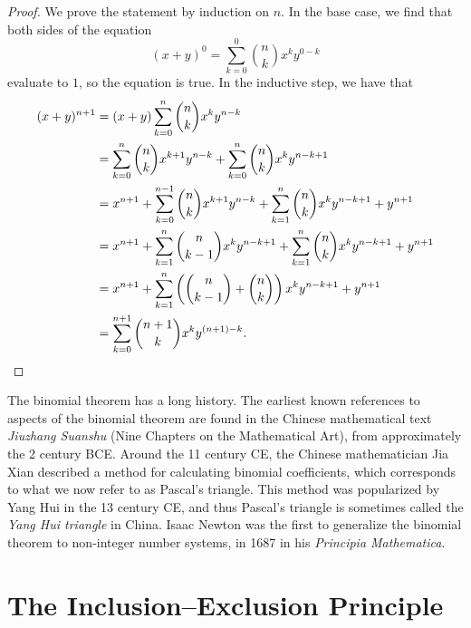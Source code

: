 \begin{proof}
  We prove the statement by induction on $n$. In the base case, we find that both sides of the equation
  \begin{equation*}
    (x+y)^0=\sum_{k=0}^0 \binom{n}{k}x^ky^{0-k}
  \end{equation*}
  evaluate to $1$, so the equation is true. In the inductive step, we have that
  \begin{align*}
    (x+y)^{n+1} & =(x+y)\sum_{k=0}^n \binom{n}{k}x^ky^{n-k} \\
                & = \sum_{k=0}^n \binom{n}{k}x^{k+1}y^{n-k} + \sum_{k=0}^n\binom{n}{k}x^ky^{n-k+1} \\
                & = x^{n+1} + \sum_{k=0}^{n-1} \binom{n}{k}x^{k+1}y^{n-k} + \sum_{k=1}^n\binom{n}{k}x^ky^{n-k+1} + y^{n+1} \\
                & = x^{n+1} + \sum_{k=1}^{n} \binom{n}{k-1}x^{k}y^{n-k+1} + \sum_{k=1}^n\binom{n}{k}x^ky^{n-k+1} + y^{n+1} \\
                & = x^{n+1} + \sum_{k=1}^n \left(\binom{n}{k-1}+\binom{n}{k}\right)x^ky^{n-k+1}+y^{n+1} \\
    & = \sum_{k=0}^{n+1} \binom{n+1}{k}x^ky^{(n+1)-k}.\qedhere
  \end{align*}
\end{proof}

The binomial theorem has a long history. The earliest known references to aspects of the binomial theorem are found in the Chinese mathematical text \emph{Jiuzhang Suanshu} (Nine Chapters on the Mathematical Art), from approximately the 2\supnd{} century BCE. Around the 11\supth{} century CE, the Chinese mathematician Jia Xian described a method for calculating binomial coefficients, which corresponds to what we now refer to as Pascal’s triangle. This method was popularized by Yang Hui in the 13\supth{} century CE, and thus Pascal’s triangle is sometimes called the \emph{Yang Hui triangle} in China. Isaac Newton was the first to generalize the binomial theorem to non-integer number systems, in 1687 in his \emph{Principia Mathematica}.

\section{The Inclusion--Exclusion Principle}

